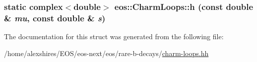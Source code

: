 \label{structeos_1_1CharmLoops_a8255879e6ac2840a7bfc652aceac5221}
\hypertarget{structeos_1_1CharmLoops_a2b0657d433f9e17904202a5309d3a4a2}{
\subsubsection[{h}]{\setlength{\rightskip}{0pt plus 5cm}static complex$<$double$>$ eos::CharmLoops::h (const double \& {\em mu}, \/  const double \& {\em s})}}
\label{structeos_1_1CharmLoops_a2b0657d433f9e17904202a5309d3a4a2}


The documentation for this struct was generated from the following file:\begin{DoxyCompactItemize}
\item 
/home/alexshires/EOS/eos-\/next/eos/rare-\/b-\/decays/\hyperlink{charm-loops_8hh}{charm-\/loops.hh}\end{DoxyCompactItemize}
